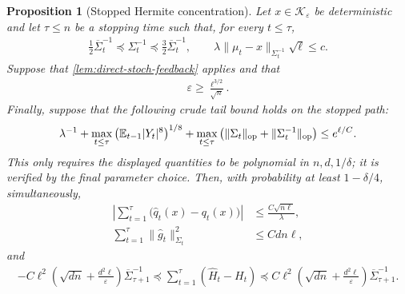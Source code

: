 \documentclass{article}
\theoremstyle{plain}
\newtheorem{proposition}[theorem]{Proposition}
\theoremstyle{definition}
\theoremstyle{plain}
\newcommand{\E}{\mathbb E}
\newcommand{\cK}{\mathcal K}
\begin{document}
\begin{proposition}[Stopped Hermite concentration]
    \label{prop:direct-stoch-concentration}
    Let $x\in\cK_\varepsilon$ be deterministic and let $\tau\leq n$ be
    a stopping time such that, for every $t\leq\tau$,
    \begin{align}
        \frac12\overline\Sigma_t^{-1}
        \preceq\Sigma_t^{-1}
        \preceq\frac32\overline\Sigma_t^{-1},
        \qquad
        \lambda\|\mu_t-x\|_{\Sigma_t^{-1}}\sqrt\ell\leq c.
        \label{eq:direct-stoch-concentration-assumptions}
    \end{align}
    Suppose that \cref{lem:direct-stoch-feedback} applies and that
    \begin{align}
        \varepsilon\geq\frac{\ell^{3/2}}{\sqrt n}.
        \label{eq:direct-stoch-q-increment-condition}
    \end{align}
    Finally, suppose that the following crude tail bound holds on the
    stopped path:
    \begin{align}
        \lambda^{-1}
        +\max_{t\leq\tau}
        \left(\E_{t-1}|Y_t|^8\right)^{1/8}
        +\max_{t\leq\tau}
        \left(
        \|\Sigma_t\|_{\rm op}
        +\|\Sigma_t^{-1}\|_{\rm op}
        \right)
        \leq e^{\ell/C}.
        \label{eq:direct-stoch-crude-tail}
    \end{align}
    This only requires the displayed quantities to be polynomial in
    $n,d,1/\delta$; it is verified by the final parameter choice.
    Then, with probability at least $1-\delta/4$, simultaneously,
    \begin{align}
        \left|
        \sum_{t=1}^{\tau}
        \bigl(\widehat q_t(x)-q_t(x)\bigr)
        \right|
         & \leq\frac{C\sqrt{n\ell}}{\lambda},
        \label{eq:direct-stoch-q-concentration}
        \\
        \sum_{t=1}^{\tau}
        \|\widehat g_t\|_{\Sigma_t}^2
         & \leq Cdn\ell,
        \label{eq:direct-stoch-gradient-energy}
    \end{align}
    and
    \begin{align}
        -C\ell^2\left(
        \sqrt{dn}+\frac{d^2\ell}{\varepsilon}
        \right)\overline\Sigma_{\tau+1}^{-1}
        \preceq
        \sum_{t=1}^{\tau}(\widehat H_t-H_t)
        \preceq
        C\ell^2\left(
        \sqrt{dn}+\frac{d^2\ell}{\varepsilon}
        \right)\overline\Sigma_{\tau+1}^{-1}.
        \label{eq:direct-stoch-H-path}
    \end{align}
\end{proposition}
\end{document}
